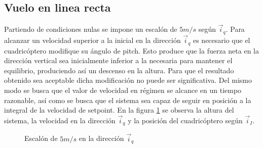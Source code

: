 \documentclass[main]{subfiles}
\begin{document}
\subsection{Vuelo en linea recta}
Partiendo de condiciones nulas se impone un escal\'on de $5m/s$ seg\'un $\vec{i}_q$. Para alcanzar un velocidad superior a la inicial en la direcci\'on $\vec{i}_q$ es necesario que el cuadric\'optero modifique su \'angulo de pitch. Esto produce que la fuerza neta en la direcci\'on vertical sea inicialmente inferior a la necesaria para mantener el equilibrio, produciendo as\'i un descenso en la altura. Para que el resultado obtenido sea aceptable dicha modificaci\'on no puede ser significativa. Del mismo modo se busca que el valor de velocidad en r\'egimen se alcance en un tiempo razonable, as\'i como se busca que el sistema sea capaz de seguir en posici\'on a la integral de la velocidad de setpoint. En la figura \ref{fig:rec_esc_x} se observa la altura del sistema, la velocidad en la direcci\'on $\vec{i}_q$ y la posici\'on del cuadric\'optero seg\'un $\vec{i}_I$. 

\begin{figure}[h!]
  \centering
 
  \caption{Escal\'on de $5m/s$ en la direcci\'on $\vec{i}_q$}
  \label{fig:rec_esc_x}
\end{figure}
\end{document}
